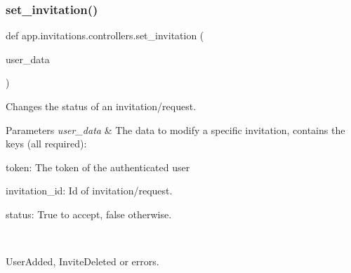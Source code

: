 \subsubsection{\texorpdfstring{set\+\_\+invitation()}{set\_invitation()}}
{\footnotesize\ttfamily def app.\+invitations.\+controllers.\+set\+\_\+invitation (\begin{DoxyParamCaption}\item[{}]{user\+\_\+data }\end{DoxyParamCaption})}



Changes the status of an invitation/request. 


\begin{DoxyParams}{Parameters}
{\em user\+\_\+data} & The data to modify a specific invitation, contains the keys (all required)\+:
\begin{DoxyItemize}
\item token\+: The token of the authenticated user
\item invitation\+\_\+id\+: Id of invitation/request.
\item status\+: True to accept, false otherwise.
\end{DoxyItemize}\\
\hline
\end{DoxyParams}
User\+Added, Invite\+Deleted or errors. 